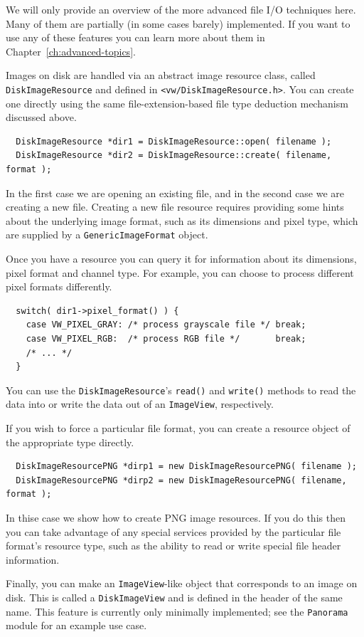 We will only provide an overview of the more advanced file I/O 
techniques here.  Many of them are partially (in some cases barely) 
implemented.  If you want to use any of these features you can 
learn more about them in Chapter~\ref{ch:advanced-topics}.

Images on disk are handled via an abstract image resource
class, called \verb#DiskImageResource# and defined in
\verb#<vw/DiskImageResource.h>#.  You can create one directly using
the same file-extension-based file type deduction mechanism discussed
above.
\begin{verbatim}
  DiskImageResource *dir1 = DiskImageResource::open( filename );
  DiskImageResource *dir2 = DiskImageResource::create( filename, format );
\end{verbatim}
In the first case we are opening an existing file, and in the second 
case we are creating a new file.  Creating a new file resource requires 
providing some hints about the underlying image format, such as its 
dimensions and pixel type, which are supplied by a \verb#GenericImageFormat# 
object.

Once you have a resource you can query it for information about its 
dimensions, pixel format and channel type.  For example, you can choose 
to process different pixel formats differently.
\begin{verbatim}
  switch( dir1->pixel_format() ) {
    case VW_PIXEL_GRAY: /* process grayscale file */ break;
    case VW_PIXEL_RGB:  /* process RGB file */       break;
    /* ... */
  }
\end{verbatim}
You can use the \verb#DiskImageResource#'s \verb#read()# and \verb#write()# 
methods to read the data into or write the data out of an \verb#ImageView#, 
respectively.

If you wish to force a particular file format, you can create a resource 
object of the appropriate type directly.
\begin{verbatim}
  DiskImageResourcePNG *dirp1 = new DiskImageResourcePNG( filename );
  DiskImageResourcePNG *dirp2 = new DiskImageResourcePNG( filename, format );
\end{verbatim}
In thise case we show how to create PNG image resources.  If you do this 
then you can take advantage of any special services provided by the 
particular file format's resource type, such as the ability to read or 
write special file header information.

Finally, you can make an \verb#ImageView#-like object that corresponds 
to an image on disk.  This is called a \verb#DiskImageView# and is 
defined in the header of the same name.  This feature is currently 
only minimally implemented; see the \verb#Panorama# module for an 
example use case.

